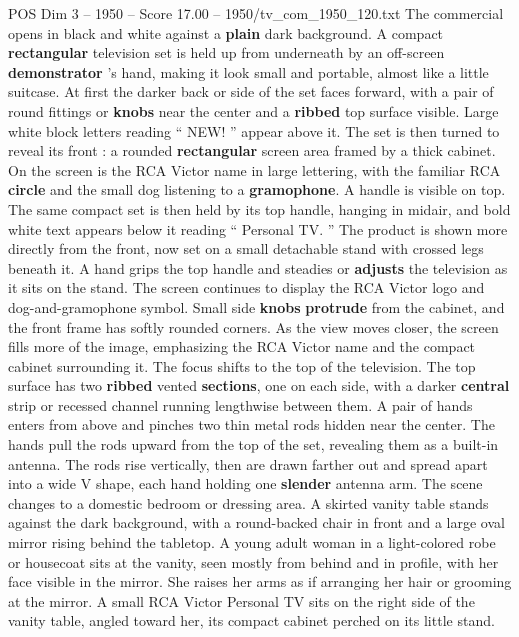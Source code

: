 \begin{textsample}{POS Dim 3 – 1950 – Score 17.00 – 1950/tv\_com\_1950\_120.txt}  \label{ex:f3_pos_005}
The commercial opens in black and white against a \textbf{plain} dark background.
A compact \textbf{rectangular} television set is held up from underneath by an off-screen \textbf{demonstrator} ’s hand, making it look small and portable, almost like a little suitcase.
At first the darker back or side of the set faces forward, with a pair of round fittings or \textbf{knobs} near the center and a \textbf{ribbed} top surface visible.
Large white block letters reading “ NEW! ” appear above it.
The set is then turned to reveal its front : a rounded \textbf{rectangular} screen area framed by a thick cabinet.
On the screen is the RCA Victor name in large lettering, with the familiar RCA \textbf{circle} and the small dog listening to a \textbf{gramophone}.
A handle is visible on top.
The same compact set is then held by its top handle, hanging in midair, and bold white text appears below it reading “ Personal TV. ” The product is shown more directly from the front, now set on a small detachable stand with crossed legs beneath it.
A hand grips the top handle and steadies or \textbf{adjusts} the television as it sits on the stand.
The screen continues to display the RCA Victor logo and dog-and-gramophone symbol.
Small side \textbf{knobs} \textbf{protrude} from the cabinet, and the front frame has softly rounded corners.
As the view moves closer, the screen fills more of the image, emphasizing the RCA Victor name and the compact cabinet surrounding it.
The focus shifts to the top of the television.
The top surface has two \textbf{ribbed} vented \textbf{sections}, one on each side, with a darker \textbf{central} strip or recessed channel running lengthwise between them.
A pair of hands enters from above and pinches two thin metal rods hidden near the center.
The hands pull the rods upward from the top of the set, revealing them as a built-in antenna.
The rods rise vertically, then are drawn farther out and spread apart into a wide V shape, each hand holding one \textbf{slender} antenna arm.
The scene changes to a domestic bedroom or dressing area.
A skirted vanity table stands against the dark background, with a round-backed chair in front and a large oval mirror rising behind the tabletop.
A young adult woman in a light-colored robe or housecoat sits at the vanity, seen mostly from behind and in profile, with her face visible in the mirror.
She raises her arms as if arranging her hair or grooming at the mirror.
A small RCA Victor Personal TV sits on the right side of the vanity table, angled toward her, its compact cabinet perched on its little stand.

\end{textsample}
